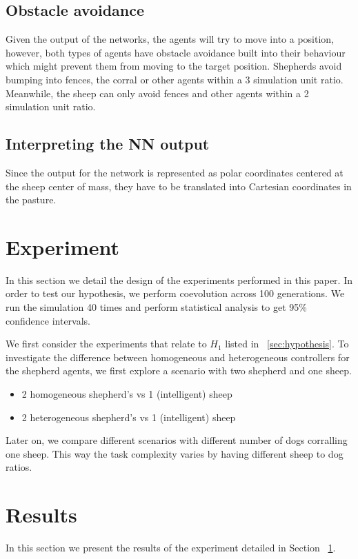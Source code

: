 \documentclass[conference]{IEEEtran}
\begin{document}
\subsection{Obstacle avoidance}
Given the output of the networks, the agents will try to move into a position, however, both types of agents have obstacle avoidance built into their behaviour which might prevent them from moving to the target position. Shepherds avoid bumping into fences, the corral or other agents within a 3 simulation unit ratio. Meanwhile, the sheep can only avoid fences and other agents within a 2 simulation unit ratio. 

\subsection{Interpreting the NN output}
Since the output for the network is represented as polar coordinates centered at the sheep center of mass, they have to be translated into Cartesian coordinates in the pasture. 


\section{Experiment}
\label{sec:experiment}
In this section we detail the design of the experiments performed in this paper. In order to test our hypothesis, we perform coevolution across 100 generations. We run the simulation 40 times and perform statistical analysis to get 95\% confidence intervals.


We first consider the experiments that relate to $H_1$ listed in ~\ref{sec:hypothesis}. To investigate the difference between homogeneous and heterogeneous controllers for the shepherd agents, we first explore a scenario with two shepherd and one sheep. 
\begin{itemize}
	\item 2 homogeneous shepherd’s vs 1 (intelligent) sheep
	\item 2 heterogeneous shepherd’s vs 1 (intelligent) sheep
\end{itemize}
 
 Later on, we compare different scenarios with different number of dogs corralling one sheep. This way the task complexity varies by having different sheep to dog ratios. 


\section{Results}
In this section we present the results of the experiment detailed in Section ~\ref{sec:experiment}.
\end{document}
